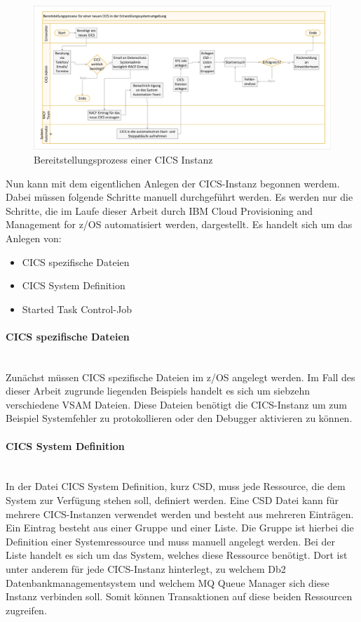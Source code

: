 \begin{figure}[ht!]
\centering
\includegraphics[width=\paperwidth,angle=90]{figures/swimlaneCICS.pdf}
\caption{Bereitstellungsprozess einer CICS Instanz}
\label{fig:aktcics}
\end{figure}

Nun kann mit dem eigentlichen Anlegen der CICS-Instanz begonnen werdem.
Dabei müssen folgende Schritte manuell durchgeführt werden.
Es werden nur die Schritte, die im Laufe dieser Arbeit durch \glqq IBM Cloud Provisioning and Management for z/OS\grqq{} automatisiert werden, dargestellt.
Es handelt sich um das Anlegen von:

\begin{itemize}
\item CICS spezifische Dateien
\item \glqq CICS System Definition\grqq
\item Started Task Control-Job
\end{itemize}

\paragraph{CICS spezifische Dateien}\label{sssec:speziDat} ~\\
Zunächst müssen CICS spezifische Dateien im z/OS angelegt werden.
Im Fall des dieser Arbeit zugrunde liegenden Beispiels handelt es sich um siebzehn verschiedene VSAM Dateien.
Diese Dateien benötigt die CICS-Instanz um zum Beispiel Systemfehler zu protokollieren oder den Debugger aktivieren zu können.

\paragraph{\glqq CICS System Definition\grqq} ~\\
In der Datei \glqq CICS System Definition\grqq, kurz CSD, muss jede Ressource, die dem System zur Verfügung stehen soll, definiert werden.
Eine CSD Datei kann für mehrere CICS-Instanzen verwendet werden und besteht aus mehreren Einträgen.
Ein Eintrag besteht aus einer Gruppe und einer Liste.
Die Gruppe ist hierbei die Definition einer Systemressource und muss manuell angelegt werden.
Bei der Liste handelt es sich um das System, welches diese Ressource benötigt.
Dort ist unter anderem für jede CICS-Instanz hinterlegt, zu welchem Db2 Datenbankmanagementsystem und welchem MQ Queue Manager sich diese Instanz verbinden soll.
Somit können Transaktionen auf diese beiden Ressourcen zugreifen.

